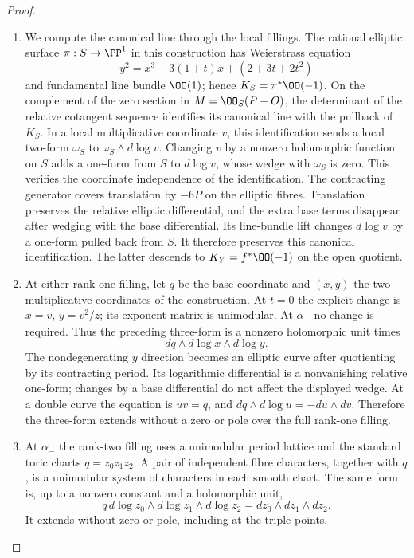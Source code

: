\begin{proof}

\begin{enumerate}[label={$\langle1\rangle$\arabic*.},leftmargin=*]
\item We compute the canonical line through the local fillings.
The rational elliptic surface $\pi:S\to\PP^1$ in this construction
has Weierstrass equation
\[
y^2=x^3-3(1+t)x+(2+3t+2t^2)
\]
and fundamental line bundle $\OO(1)$; hence
$K_S=\pi^*\OO(-1)$. On the complement of the zero section in
$M=\OO_S(P-O)$, the determinant of the relative cotangent sequence
identifies its canonical line with the pullback of $K_S$.
In a local multiplicative coordinate $v$, this identification sends
a local two-form $\omega_S$ to $\omega_S\wedge d\log v$.
Changing $v$ by a nonzero holomorphic function on $S$ adds a
one-form from $S$ to $d\log v$, whose wedge with $\omega_S$ is zero.
This verifies the coordinate independence of the identification.
The contracting generator covers translation by $-6P$ on the
elliptic fibres. Translation preserves the relative elliptic
differential, and the extra base terms disappear after wedging
with the base differential. Its line-bundle lift changes $d\log v$
by a one-form pulled back from $S$. It therefore preserves this canonical
identification. The latter descends to
$K_Y=f^*\OO(-1)$ on the open quotient.

\item At either rank-one filling, let $q$ be the base coordinate and
$(x,y)$ the two multiplicative coordinates of the construction.
At $t=0$ the explicit change is $x=v$, $y=v^2/z$; its exponent
matrix is unimodular. At $\alpha_+$ no change is required.
Thus the preceding three-form is a nonzero holomorphic unit times
\[
dq\wedge d\log x\wedge d\log y.
\]
The nondegenerating $y$ direction becomes an elliptic curve after
quotienting by its contracting period. Its logarithmic differential
is a nonvanishing relative one-form; changes by a base differential
do not affect the displayed wedge. At a double curve the equation
is $uv=q$, and
$dq\wedge d\log u=-du\wedge dv$. Therefore the three-form extends
without a zero or pole over the full rank-one filling.

\item At $\alpha_-$ the rank-two filling uses a unimodular period lattice
and the standard toric charts $q=z_0z_1z_2$. A pair of independent
fibre characters, together with $q$, is a unimodular system of
characters in each smooth chart. The same form is, up to a nonzero
constant and a holomorphic unit,
\[
q\,d\log z_0\wedge d\log z_1\wedge d\log z_2
=dz_0\wedge dz_1\wedge dz_2.
\]
It extends without zero or pole, including at the triple points.


\end{enumerate}
\end{proof}
